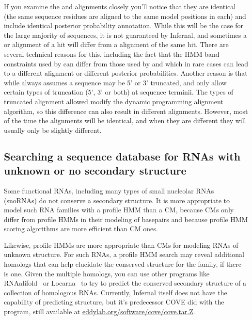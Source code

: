 If you examine the  and  alignments closely
you'll notice that they are identical (the same sequence residues are
aligned to the same model positions in each) and include identical
posterior probability annotation. While this will be the case for the
large majority of sequences, it is not guaranteed by Infernal, and
sometimes a  or  alignment of a hit will
differ from a  alignment of the same hit. There are
several technical reasons for this, including the fact that the HMM
band constraints used by  can differ from those used by
 and  which in rare cases can lead to a
different alignment or different posterior probabilities. Another
reason is that while  always assumes a sequence may be
5' or 3' truncated,  and  only allow
certain types of truncation (5', 3' or both) at sequence
terminii. The types of truncated alignment allowed modify the
dynamic programming alignment algorithm, so this difference can also
result in different alignments. However, most of the time the
alignments will be identical, and when they are different they will
usually only be slightly different.

\subsection{Searching a sequence database for RNAs with unknown or no
 secondary structure}

Some functional RNAs, including many types of small nucleolar RNAs
(snoRNAs) do not conserve a secondary structure. It is more
appropriate to model such RNA families with a profile HMM than a CM,
because CMs only differ from profile HMMs in their modeling of
basepairs and because profile HMM scoring algorithms are more
efficient than CM ones.

Likewise, profile HMMs are more appropriate than CMs for modeling RNAs
of unknown structure. For such RNAs, a profile HMM search may reveal
additional homologs that can help elucidate the conserved structure
for the family, if there is one. Given the multiple homologs, you can
use other programs like RNAalifold~\citep{Bernhart08,Hofacker02} or
Locarna~\citep{Will12} to try to predict the conserved secondary
structure of a collection of homologous RNAs. Currently, Infernal
itself does not have the capability of predicting structure, but it's
predecessor COVE did with the  program, still available at
\url{eddylab.org/software/cove/cove.tar.Z}.

